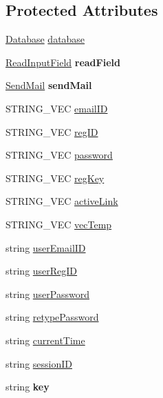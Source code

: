 \subsection*{Protected Attributes}
\begin{DoxyCompactItemize}
\item 
\hyperlink{classDatabase}{Database} \hyperlink{classUser_ae693492927dc1ebbca8407137d1f78d3}{database}
\item 
\hypertarget{classUser_a597b9af071a70e4c8b667b8a3a809748}{\hyperlink{classReadInputField}{Read\-Input\-Field} {\bfseries read\-Field}}\label{classUser_a597b9af071a70e4c8b667b8a3a809748}

\item 
\hypertarget{classUser_a153c98de993eed5e0766d2f2610df108}{\hyperlink{classSendMail}{Send\-Mail} {\bfseries send\-Mail}}\label{classUser_a153c98de993eed5e0766d2f2610df108}

\item 
S\-T\-R\-I\-N\-G\-\_\-\-V\-E\-C \hyperlink{classUser_a2bc69a747b93045d1dce16bd5cd00b9b}{email\-I\-D}
\item 
S\-T\-R\-I\-N\-G\-\_\-\-V\-E\-C \hyperlink{classUser_a06abd54eca25f11ccdb4c326812e34ee}{reg\-I\-D}
\item 
S\-T\-R\-I\-N\-G\-\_\-\-V\-E\-C \hyperlink{classUser_a77b451700a9695b2a0905a12f8aedd44}{password}
\item 
S\-T\-R\-I\-N\-G\-\_\-\-V\-E\-C \hyperlink{classUser_a8753abeefb69d3c9db3c585992c7944f}{reg\-Key}
\item 
S\-T\-R\-I\-N\-G\-\_\-\-V\-E\-C \hyperlink{classUser_a96dbf856809021df4b12c3a0f175f747}{active\-Link}
\item 
S\-T\-R\-I\-N\-G\-\_\-\-V\-E\-C \hyperlink{classUser_addb446e2ea86d984e243909311967052}{vec\-Temp}
\item 
string \hyperlink{classUser_a18c8f47943a8ebefcdaa709636a53e81}{user\-Email\-I\-D}
\item 
string \hyperlink{classUser_a2e4c2abea5d64bf9bfcd1c73b227a6b8}{user\-Reg\-I\-D}
\item 
string \hyperlink{classUser_aabe10090d6867d81bc17dd6c362196e8}{user\-Password}
\item 
string \hyperlink{classUser_af51ac37cc65721f03e592311d7ead4d4}{retype\-Password}
\item 
string \hyperlink{classUser_a55989a6bc06339e3dc1de6aa5dc25c38}{current\-Time}
\item 
string \hyperlink{classUser_ab60b88d500e9575634790a518dc584d7}{session\-I\-D}
\item 
\hypertarget{classUser_a53621db039b9952bb48e2bac0bfaa9bf}{string {\bfseries key}}\label{classUser_a53621db039b9952bb48e2bac0bfaa9bf}


\end{DoxyCompactItemize}
